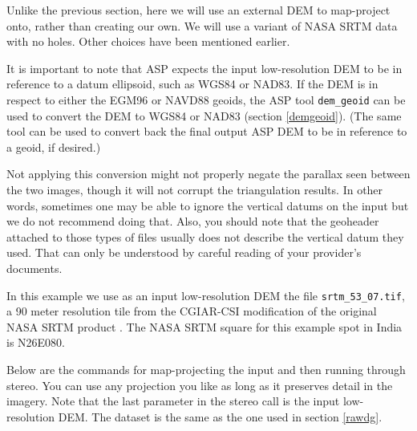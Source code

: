 Unlike the previous section, here we will use an external DEM to map-project
onto, rather than creating our own. We will use a variant of NASA
SRTM data with no holes. Other choices have been mentioned earlier.

It is important to note that ASP expects the input low-resolution DEM to
be in reference to a datum ellipsoid, such as WGS84 or NAD83. If the DEM
is in respect to either the EGM96 or NAVD88 geoids, the ASP tool
\texttt{dem\_geoid} can be used to convert the DEM to WGS84 or NAD83
(section \ref{demgeoid}). (The same tool can be used to convert back the
final output ASP DEM to be in reference to a geoid, if desired.)

Not applying this conversion might not properly negate the parallax
seen between the two images, though it will not corrupt the
triangulation results. In other words, sometimes one may be able to
ignore the vertical datums on the input but we do not recommend
doing that. Also, you should note that the geoheader attached to those
types of files usually does not describe the vertical datum they
used. That can only be understood by careful reading of your
provider's documents.

In this example we use as an input low-resolution DEM the file
\texttt{srtm\_53\_07.tif}, a 90 meter resolution tile from the CGIAR-CSI
modification of the original NASA SRTM product \cite{cgiar:srtm90m}.
The NASA SRTM square for this example spot in India is N26E080.

Below are the commands for map-projecting the input and then running
through stereo. You can use any projection you like as long as it
preserves detail in the imagery. Note that the last parameter in the
stereo call is the input low-resolution DEM. The dataset is the same
as the one used in section \ref{rawdg}.

